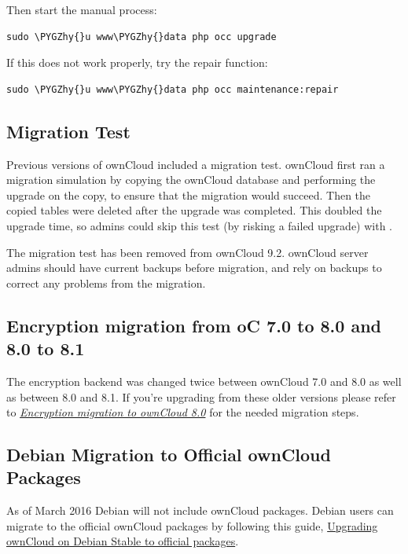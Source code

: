 \documentclass[letterpaper,10pt,english]{sphinxmanual}
\def\PYGZhy{\char`\-}
\begin{document}
Then start the manual process:

\begin{Verbatim}[commandchars=\\\{\}]
sudo \PYGZhy{}u www\PYGZhy{}data php occ upgrade
\end{Verbatim}

If this does not work properly, try the repair function:

\begin{Verbatim}[commandchars=\\\{\}]
sudo \PYGZhy{}u www\PYGZhy{}data php occ maintenance:repair
\end{Verbatim}


\subsection{Migration Test}
\label{maintenance/upgrade:migration-test-label}\label{maintenance/upgrade:migration-test}
Previous versions of ownCloud included a migration test. ownCloud first ran a migration
simulation by copying the ownCloud database and performing the upgrade on the copy, to
ensure that the migration would succeed. Then the copied tables were deleted after the
upgrade was completed. This doubled the upgrade time, so admins could skip this test
(by risking a failed upgrade) with .

The migration test has been removed from ownCloud 9.2. ownCloud server admins should have
current backups before migration, and rely on backups to correct any problems from the migration.


\subsection{Encryption migration from oC 7.0 to 8.0 and 8.0 to 8.1}
\label{maintenance/upgrade:encryption-migration-from-oc-7-0-to-8-0-and-8-0-to-8-1}
The encryption backend was changed twice between ownCloud 7.0 and 8.0 as well as
between 8.0 and 8.1. If you're upgrading from these older versions please refer to
{\hyperref[configuration_files/encryption_configuration:upgrading\string-encryption\string-label]{\emph{Encryption migration to ownCloud 8.0}}} for the needed migration steps.


\subsection{Debian Migration to Official ownCloud Packages}
\label{maintenance/upgrade:debian-migration-to-official-owncloud-packages}
As of March 2016 Debian will not include ownCloud packages. Debian users can
migrate to the official ownCloud packages by following this guide,
\href{https://owncloud.org/blog/upgrading-owncloud-on-debian-stable-to-official-packages/}{Upgrading ownCloud on Debian Stable to official packages}.
\end{document}
